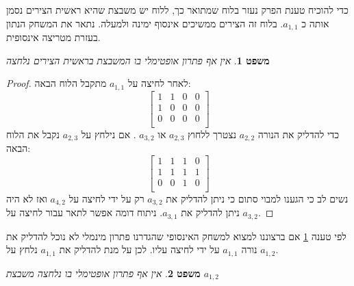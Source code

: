 \documentclass[12pt,leqno]{article}
\theoremstyle{theoremdd}
\newtheorem{theorem}{משפט}
\begin{document}
כדי להוכיח טענת הפרק נעזר בלוח שמתואר כך,
ללוח יש משבצת שהיא ראשית הצירים 
נסמן אותה כ 
$a_{1,1}$.
בלוח זה  הצירים ממשיכים אינסוף ימינה ולמעלה.
נתאר את המשחק הנתון בעזרת מטריצה אינסופית.
\begin{theorem}
    \label{thm:cant-press-a11}
    אין אף פתרון 
    אופטימלי בו המשבצת בראשית הצירים נלחצה 
\end{theorem}
\begin{proof}
    לאחר לחיצה על 
    $a_{1,1}$
    מתקבל הלוח הבאה:
    \[
        \begin{bmatrix}
            1 & 1 & 0 & 0 \\
            1 & 0 & 0 & 0 \\
            0 & 0 & 0 & 0 \\
        \end{bmatrix}
    \]
    כדי להדליק 
    את הנורה
    $a_{2,2}$
    נצטרך 
    ללחוץ
    $a_{2,3}$
    או 
    $a_{3,2}$
    .
    אם נילחץ על
   $a_{2,3}$
   נקבל את הלוח הבאה:
   \[
        \begin{bmatrix}
            1 & 1 & 1 & 0 \\
            1 & 1 & 1 & 1 \\
            0 & 0 & 1 & 0 \\
        \end{bmatrix}
    \]
    נשים לב כי הגענו למבוי סתום כי
    ניתן להדליק את 
    $a_{3,2}$
    רק על ידי לחיצה על 
   $a_{4,2}$ 
   ואז לא היה ניתן להדליק את 
   $a_{3,1}$.
   ניתוח דומה אפשר לתאר עבור 
   לחיצה על 
   $a_{3,2}$.
\end{proof}
לפי טענה
\ref{thm:cant-press-a11}
אם ברצוננו למצוא למשחק האינסופי שהגדרנו פתרון מינמלי לא נוכל 
להדליק את נורה 
$a_{1,1}$
על ידי לחיצה עליו.
לכן על מנת להדליק את 
$a_{1,1}$
נלחץ על 
$a_{1,2}$.
\begin{theorem}
    \label{thm:cant-press-a12}
    אין אף פתרון 
    אופטימלי בו נלחצה 
    משבצת
    $a_{1,2}$
\end{theorem}
\end{document}
